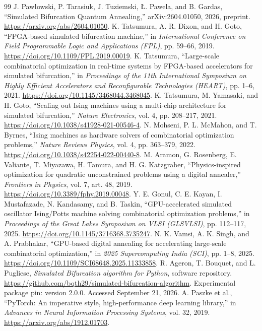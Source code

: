\documentclass[11pt,a4paper]{article}
\begin{document}
\begin{thebibliography}{99}
 J. Paw{\l}owski, P. Tarasiuk, J. Tuziemski, {\L}. Pawela, and B. Gardas, ``Simulated Bifurcation Quantum Annealing,'' arXiv:2604.01050, 2026, preprint. \url{https://arxiv.org/abs/2604.01050}.
 K. Tatsumura, A. R. Dixon, and H. Goto, ``FPGA-based simulated bifurcation machine,'' in \textit{International Conference on Field Programmable Logic and Applications (FPL)}, pp. 59--66, 2019. \url{https://doi.org/10.1109/FPL.2019.00019}.
 K. Tatsumura, ``Large-scale combinatorial optimization in real-time systems by FPGA-based accelerators for simulated bifurcation,'' in \textit{Proceedings of the 11th International Symposium on Highly Efficient Accelerators and Reconfigurable Technologies (HEART)}, pp. 1--6, 2021. \url{https://doi.org/10.1145/3468044.3468045}.
 K. Tatsumura, M. Yamasaki, and H. Goto, ``Scaling out Ising machines using a multi-chip architecture for simulated bifurcation,'' \textit{Nature Electronics}, vol. 4, pp. 208--217, 2021. \url{https://doi.org/10.1038/s41928-021-00546-4}.
 N. Mohseni, P. L. McMahon, and T. Byrnes, ``Ising machines as hardware solvers of combinatorial optimization problems,'' \textit{Nature Reviews Physics}, vol. 4, pp. 363--379, 2022. \url{https://doi.org/10.1038/s42254-022-00440-8}.
 M. Aramon, G. Rosenberg, E. Valiante, T. Miyazawa, H. Tamura, and H. G. Katzgraber, ``Physics-inspired optimization for quadratic unconstrained problems using a digital annealer,'' \textit{Frontiers in Physics}, vol. 7, art. 48, 2019. \url{https://doi.org/10.3389/fphy.2019.00048}.
 Y. E. Gonul, C. E. Kayan, I. Mustafazade, N. Kandasamy, and B. Taskin, ``GPU-accelerated simulated oscillator Ising/Potts machine solving combinatorial optimization problems,'' in \textit{Proceedings of the Great Lakes Symposium on VLSI (GLSVLSI)}, pp. 112--117, 2025. \url{https://doi.org/10.1145/3716368.3735247}.
 N. K. Vamsi, A. K. Singh, and A. Prabhakar, ``GPU-based digital annealing for accelerating large-scale combinatorial optimization,'' in \textit{2025 Supercomputing India (SCI)}, pp. 1--8, 2025. \url{https://doi.org/10.1109/SCI68648.2025.11333858}.
 R. Ageron, T. Bouquet, and L. Pugliese, \textit{Simulated Bifurcation algorithm for Python}, software repository. \url{https://github.com/bqth29/simulated-bifurcation-algorithm}. Experimental package pin: version 2.0.0. Accessed September 21, 2026.
 A. Paszke et al., ``PyTorch: An imperative style, high-performance deep learning library,'' in \textit{Advances in Neural Information Processing Systems}, vol. 32, 2019. \url{https://arxiv.org/abs/1912.01703}.

\end{thebibliography}
\end{document}
